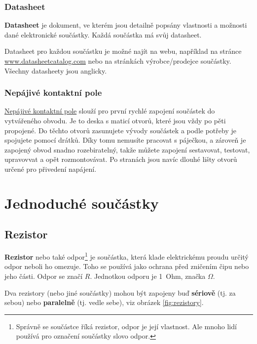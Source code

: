 
\label{elektronika}

\subsubsection*{Datasheet}

{\bf Datasheet}  je dokument, ve kterém jsou detailně popsány vlastnosti a možnosti dané elektronické součástky.
Každá součástka má svůj datasheet. 

Datasheet pro každou součástku je možné najít na webu, například na stránce \url{www.datasheetcatalog.com}
nebo na stránkách výrobce/prodejce součástky. 
Všechny datasheety jsou anglicky.  

\subsubsection*{Nepájivé kontaktní pole} \label{nepajive_pole} 

 \href{https://cs.wikipedia.org/wiki/Nep\%C3\%A1jiv\%C3\%A9_pole}{Nepájivé kontaktní pole}
  slouží pro první rychlé zapojení součástek do vytvářeného obvodu.
 Je to deska s maticí otvorů, které jsou vždy po pěti propojené. Do těchto otvorů zasunujete vývody součástek a podle potřeby je spojujete pomocí drátků. Díky tomu nemusíte pracovat s páječkou, a zároveň je zapojený obvod snadno rozebiratelný, takže můžete zapojení sestavovat, testovat, upravovvat a opět rozmontovávat. Po stranách jsou navíc dlouhé lišty otvorů určené pro přivedení napájení. 


\section{Jednoduché součástky} 


\subsection{Rezistor} \label{rezistor}

{\bf Rezistor}   nebo také odpor\footnote{Správně se součástce říká rezistor, odpor je její vlastnost.
	 Ale mnoho lidí používá pro označení součástky slovo odpor.} je součástka, která klade elektrickému proudu  určitý odpor neboli ho omezuje. 
	Toho se používá jako ochrana před zničením čipu nebo jeho části. Odpor se značí $R$. Jednotkou odporu je 1~Ohm, značka $\Omega$. 

 Dva rezistory (nebo jiné součástky) mohou být zapojeny buď 
 {\bf sériově}  \label{seriove}
 (tj. za sebou) nebo {\bf paralelně} (tj. vedle sebe), viz obrázek \ref{fig:rezistory}. 

